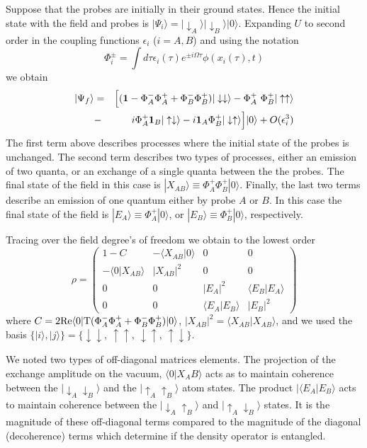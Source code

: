 \documentclass[12pt]{article}
\newcommand{\beq}{\begin{equation}}
\newcommand{\eeq}{\end{equation}}
\newcommand{\beqa}{\begin{eqnarray}}
\newcommand{\eeqa}{\end{eqnarray}}
\def \la {\langle}
\def \ra {\rangle}
\def \up {\uparrow}
\def \down {\downarrow}
\begin{document}
Suppose that the probes are initially in their ground states.
 Hence the initial state with the field and probes is
$|\Psi_i\ra =|\down_A\ra|\down_B\ra |0\ra$.
Expanding $U$ to second order in the coupling functions
$\epsilon_i$ ($i=A,B$)
and using the notation
\beq
\Phi_i^\pm = \int d\tau\epsilon_i(\tau)e^{\pm i\Omega
\tau}\phi(x_i(\tau),t)
\eeq
we obtain
\beqa
|\Psi_f\ra
&=&\Bigl[({\bf 1} - \Phi^-_A\Phi_A^+ +
\Phi^-_B\Phi_B^+)|\down\down\ra
- \Phi^+_A\  \Phi^+_B|\up\up\ra
\nonumber \\
&-&i\Phi^+_A {\bf 1}_B|\up\down\ra -
i{\bf 1}_A \Phi^+_B|\down\up\ra \Bigr]|0\ra + O(\epsilon_i^3)
\eeqa
The first term above describes processes where the
initial  state of the probes is
unchanged.
The  second term describes two types of processes,
either an emission
of two quanta, or an exchange of a single quanta between the
the probes.
The final state of the field in this case
is $|X_{AB}\ra\equiv \Phi^+_A\Phi^+_B|0\ra$.
Finally, the last two terms describe an emission of one quantum
either by probe  $A$ or $B$.
In this case the final state of
the field is $|E_A\ra\equiv \Phi^+_A|0\ra$, or $|E_B\ra\equiv
\Phi_B^+|0\ra$, respectively.


Tracing over the field degree's of freedom we obtain to the
lowest order
\beq
\rho=
\left(
\begin{array}{cccc}
1 -C   & - \la X_{AB}|0\ra & 0  & 0 \\
-\la 0|X_{AB}\ra  & |X_{AB}|^2  & 0  & 0\\
0 & 0 &      |E_{A}|^2  &  \la E_B|E_A\ra    \\
0 & 0 & \la E_A|E_B\ra  &  |E_B|^2
\end{array} \right)
\label{density}
\eeq
where $C= 2{\rm Re}\la 0| {\rm T}(\Phi^-_A\Phi_A^+ +
\Phi^-_B\Phi_B^+)|0\ra$,
$|X_{AB}|^2 = \la X_{AB}|X_{AB}\ra$, and we used the basis
$\{|i\ra,|j\ra \}= \{ \down\down, \ \up\up, \ \down\up, \
\up\down \}$.

We noted two types of off-diagonal matrices elements.
The projection of the exchange amplitude on the vacuum, $\la 0|
X_AB\ra$ acts as to maintain coherence between the
$|\down_A\down_B\ra$ and the $|\up_A\up_B\ra$ atom states.
The product $|\la E_A|E_B\ra$ acts to maintain coherence
between the $|\down_A\up_B\ra$ and $|\up_A\down_B\ra$ states.
It is the magnitude of these off-diagonal terms compared
to the magnitude of the diagonal (decoherence) terms which
determine if the density operator is entangled.
\end{document}
